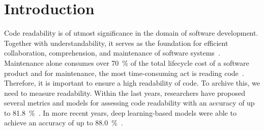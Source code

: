 \documentclass[%
class=scrreprt,
chapterprefix=false,%
open=right,%
twoside=true,%
paper=a4,%
logofile={Logo\_zentral\_farbig\_EN.png},%
thesistype=master,%
UKenglish,%
]{se2thesis}
\theoremstyle{definition}
\newcommand{\citeclassicmodels}{\cite{buse2009learning, posnett2011simpler, dorn2012general, scalabrino2018comprehensive}\xspace}
\newcommand{\citedeepmodels}{\cite{mi2018inception, mi2018improving, sharma2020egan, mi2022towards, mi2022rank, mi2023graph}\xspace}
\newcommand{\numSamples}{69k\xspace}
\begin{document}
	\pagebreak
	
	\begin{abstract}
		
		
		Deep learning-based models are achieving increasingly superior accuracy in classifying the readability of code.
		Recent research focuses mostly on different model architectures to further improve code readability classification. All models use (parts of) the same labeled dataset, consisting of 421 code snippets.
		However, deep learning-based approaches improve with a large amount of data.
		Therefore, a larger labeled dataset could greatly advance the research field of code readability classification.
		
		We investigate the use of a new dataset consisting of \numSamples code snippets with its novel generation approach.
		The generation approach involves the mining and modification of code snippets from public GitHub repositories. We validate the generated dataset using a survey with 200 participants and by training and evaluating a state-of-the-art code readability classification model both with and without the new dataset.
		In the future, our dataset might increase the accuracy of all readability classification models.

	\end{abstract}
	
	\mainmatter
	
	\tableofcontents

\chapter{Introduction} \label{Introduction}
	Code readability is of utmost significance in the domain of software development.
	Together with understandability, it serves as the foundation for efficient collaboration, comprehension, and maintenance of software systems~\cite{posnett2011simpler, aggarwal2002integrated}. 
	Maintenance alone consumes over 70~\% of the total lifecycle cost of a software product and for maintenance, the most time-consuming act is reading code~\cite{buse2009learning, deimel1985uses, rugaber2000use, boehm2001defect}.
	Therefore, it is important to ensure a high readability of code. To archive this, we need to measure readability.
	Within the last years, researchers have proposed several metrics and models for assessing code readability with an accuracy of up to 81.8~\%~\citeclassicmodels. In more recent years, deep learning-based models were able to achieve an accuracy of up to 88.0~\%~\citedeepmodels.
	
\end{document}
